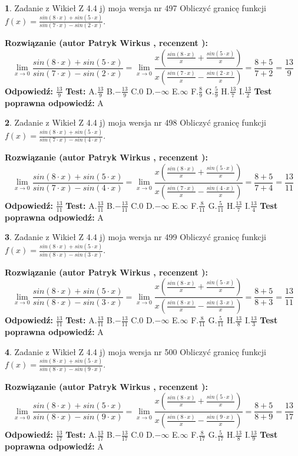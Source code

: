 \documentclass[12pt, a4paper]{article}
\theoremstyle{definition} %
\newtheorem{zad}{}
\newcommand{\zadStart}[1]{\begin{zad}#1\newline}
\newcommand{\zadStop}{\end{zad}}
\newcommand{\rozwStart}[2]{\noindent \textbf{Rozwiązanie (autor #1 , recenzent #2): }\newline}
\newcommand{\rozwStop}{\newline}
\newcommand{\odpStart}{\noindent \textbf{Odpowiedź:}\newline}
\newcommand{\odpStop}{\newline}
\newcommand{\testStart}{\noindent \textbf{Test:}\newline}
\newcommand{\testStop}{\newline}
\newcommand{\kluczStart}{\noindent \textbf{Test poprawna odpowiedź:}\newline}
\newcommand{\kluczStop}{\newline}
\begin{document}
\zadStart{Zadanie z Wikieł Z 4.4 j) moja wersja nr 497}
Obliczyć granicę funkcji $f(x)=\frac{sin(8\cdot x) +sin(5\cdot x)}{sin(7\cdot x) -sin(2\cdot x)}$.
\zadStop
\rozwStart{Patryk Wirkus}{}
$$\lim\limits_{x\to 0}\frac{sin(8\cdot x) +sin(5\cdot x)}{sin(7\cdot x) -sin(2\cdot x)}=\lim\limits_{x\to 0}\frac{x(\frac{sin(8\cdot x)}{x}+\frac{sin(5\cdot x)}{x})}{x(\frac{sin(7\cdot x)}{x}-\frac{sin(2\cdot x)}{x})}=\frac{8+5}{7+2} = \frac{13}{9}$$
\rozwStop
\odpStart
$\frac{13}{9}$
\odpStop
\testStart
A.$\frac{13}{9}$
B.$-\frac{13}{9}$
C.$0$
D.$-\infty$
E.$\infty$
F.$\frac{8}{9}$
G.$\frac{5}{9}$
H.$\frac{13}{7}$
I.$\frac{13}{2}$
\testStop
\kluczStart
A
\kluczStop



\zadStart{Zadanie z Wikieł Z 4.4 j) moja wersja nr 498}
Obliczyć granicę funkcji $f(x)=\frac{sin(8\cdot x) +sin(5\cdot x)}{sin(7\cdot x) -sin(4\cdot x)}$.
\zadStop
\rozwStart{Patryk Wirkus}{}
$$\lim\limits_{x\to 0}\frac{sin(8\cdot x) +sin(5\cdot x)}{sin(7\cdot x) -sin(4\cdot x)}=\lim\limits_{x\to 0}\frac{x(\frac{sin(8\cdot x)}{x}+\frac{sin(5\cdot x)}{x})}{x(\frac{sin(7\cdot x)}{x}-\frac{sin(4\cdot x)}{x})}=\frac{8+5}{7+4} = \frac{13}{11}$$
\rozwStop
\odpStart
$\frac{13}{11}$
\odpStop
\testStart
A.$\frac{13}{11}$
B.$-\frac{13}{11}$
C.$0$
D.$-\infty$
E.$\infty$
F.$\frac{8}{11}$
G.$\frac{5}{11}$
H.$\frac{13}{7}$
I.$\frac{13}{4}$
\testStop
\kluczStart
A
\kluczStop



\zadStart{Zadanie z Wikieł Z 4.4 j) moja wersja nr 499}
Obliczyć granicę funkcji $f(x)=\frac{sin(8\cdot x) +sin(5\cdot x)}{sin(8\cdot x) -sin(3\cdot x)}$.
\zadStop
\rozwStart{Patryk Wirkus}{}
$$\lim\limits_{x\to 0}\frac{sin(8\cdot x) +sin(5\cdot x)}{sin(8\cdot x) -sin(3\cdot x)}=\lim\limits_{x\to 0}\frac{x(\frac{sin(8\cdot x)}{x}+\frac{sin(5\cdot x)}{x})}{x(\frac{sin(8\cdot x)}{x}-\frac{sin(3\cdot x)}{x})}=\frac{8+5}{8+3} = \frac{13}{11}$$
\rozwStop
\odpStart
$\frac{13}{11}$
\odpStop
\testStart
A.$\frac{13}{11}$
B.$-\frac{13}{11}$
C.$0$
D.$-\infty$
E.$\infty$
F.$\frac{8}{11}$
G.$\frac{5}{11}$
H.$\frac{13}{8}$
I.$\frac{13}{3}$
\testStop
\kluczStart
A
\kluczStop



\zadStart{Zadanie z Wikieł Z 4.4 j) moja wersja nr 500}
Obliczyć granicę funkcji $f(x)=\frac{sin(8\cdot x) +sin(5\cdot x)}{sin(8\cdot x) -sin(9\cdot x)}$.
\zadStop
\rozwStart{Patryk Wirkus}{}
$$\lim\limits_{x\to 0}\frac{sin(8\cdot x) +sin(5\cdot x)}{sin(8\cdot x) -sin(9\cdot x)}=\lim\limits_{x\to 0}\frac{x(\frac{sin(8\cdot x)}{x}+\frac{sin(5\cdot x)}{x})}{x(\frac{sin(8\cdot x)}{x}-\frac{sin(9\cdot x)}{x})}=\frac{8+5}{8+9} = \frac{13}{17}$$
\rozwStop
\odpStart
$\frac{13}{17}$
\odpStop
\testStart
A.$\frac{13}{17}$
B.$-\frac{13}{17}$
C.$0$
D.$-\infty$
E.$\infty$
F.$\frac{8}{17}$
G.$\frac{5}{17}$
H.$\frac{13}{8}$
I.$\frac{13}{9}$
\testStop
\kluczStart
A
\kluczStop
\end{document}
